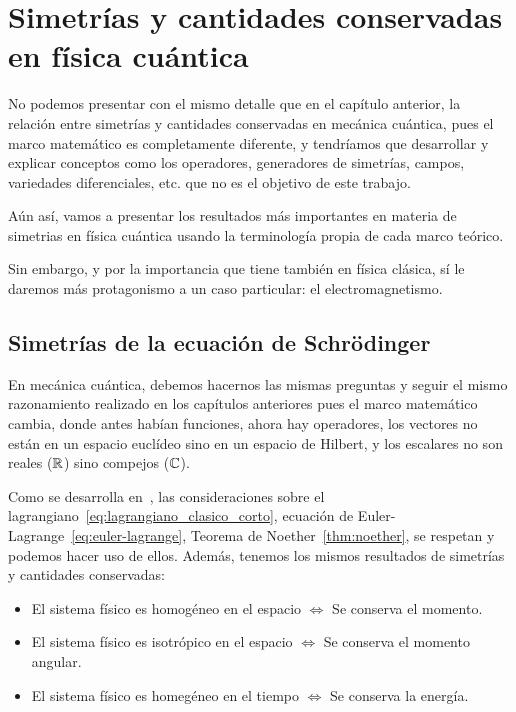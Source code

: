 
\chapter{Simetrías y cantidades conservadas en física cuántica}\label{ch:simetrias-y-cantidades-conservadas-en-fisica-cuantica}

No podemos presentar con el mismo detalle que en el capítulo anterior, la relación entre simetrías y cantidades conservadas en mecánica cuántica, pues el marco matemático es completamente diferente, y tendríamos que desarrollar y explicar conceptos como los operadores, generadores de simetrías, campos, variedades diferenciales, etc. que no es el objetivo de este trabajo.

Aún así, vamos a presentar los resultados más importantes en materia de simetrias en física cuántica usando la terminología propia de cada marco teórico.

Sin embargo, y por la importancia que tiene también en física clásica, sí le daremos más protagonismo a un caso particular: el electromagnetismo.

\section{Simetrías de la ecuación de Schrödinger}

En mecánica cuántica, debemos hacernos las mismas preguntas y seguir el mismo razonamiento realizado en los capítulos anteriores pues el marco matemático cambia, donde antes habían funciones, ahora hay operadores, los vectores no están en un espacio euclídeo sino en un espacio de Hilbert, y los escalares no son reales ($\mathbb{R}$) sino compejos ($\mathbb{C}$).

Como se desarrolla en~\cite{QMS}, las consideraciones sobre el lagrangiano~\eqref{eq:lagrangiano_clasico_corto}, ecuación de Euler-Lagrange~\eqref{eq:euler-lagrange}, Teorema de Noether~\eqref{thm:noether}, se respetan y podemos hacer uso de ellos.
Además, tenemos los mismos resultados de simetrías y cantidades conservadas:

\begin{itemize}
	\item El sistema físico es homogéneo en el espacio $\Leftrightarrow$ Se conserva el momento.
	\item El sistema físico es isotrópico en el espacio $\Leftrightarrow$ Se conserva el momento angular.
	\item El sistema físico es homegéneo en el tiempo $\Leftrightarrow$ Se conserva la energía.
\end{itemize}

